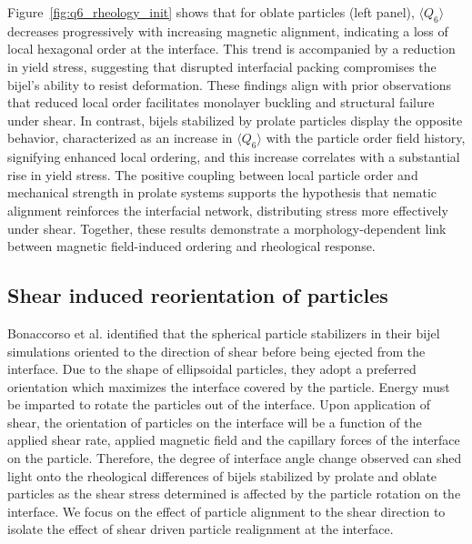 Figure~\ref{fig:q6_rheology_init} shows that for oblate particles (left panel), $\langle Q_6 \rangle$ decreases progressively with increasing magnetic alignment, 
indicating a loss of local hexagonal
order at the interface. This trend is accompanied by a reduction in yield stress, suggesting that disrupted interfacial packing compromises the bijel's 
ability to resist deformation. These findings align with prior observations that reduced local order facilitates monolayer buckling and structural failure 
under shear. In contrast, bijels stabilized by prolate particles display the opposite behavior, characterized as an increase in $\langle Q_6 \rangle$ with
the particle order field history, signifying enhanced local ordering, and this increase correlates with a substantial rise in yield stress. The positive 
coupling between local particle order and mechanical strength in prolate systems supports the hypothesis that nematic alignment reinforces the interfacial 
network, distributing stress more effectively under shear. Together, these results demonstrate a morphology-dependent link between magnetic field-induced 
ordering and rheological response. 

\subsection{Shear induced reorientation of particles}

Bonaccorso et al. identified that the spherical particle stabilizers in their bijel simulations oriented to the direction of shear before being
ejected from the interface. \cite{bonaccorso_shear_2020} Due to the shape of ellipsoidal particles, they adopt a preferred orientation which
maximizes the interface covered by the particle. \cite{davies_dipolar_2015, davies_interface_2014} Energy must be imparted to rotate the particles
out of the interface. Upon application of shear, the orientation of particles on the interface will be a function of the applied shear rate, 
applied magnetic field and the capillary forces of the interface on the particle. \cite{cao_modeling_2021, chhabra_drag_1999, brenner_stokes_1963, naga_capillary_2021}
Therefore, the degree of interface angle change observed can shed light onto the rheological 
differences of bijels stabilized by prolate and oblate particles as the shear stress determined is affected by the particle rotation on the interface. We focus on
the effect of particle alignment to the shear direction to isolate the effect of shear driven particle realignment at the interface. 

